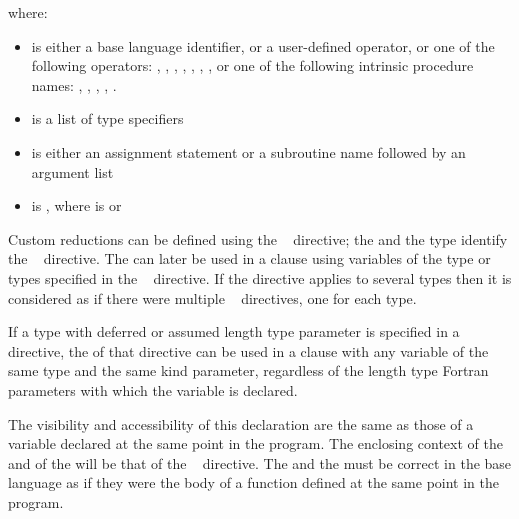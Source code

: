 where:

\begin{itemize}
\item {} is either a base language identifier, or a user-defined operator, or 
one of the following operators: 
\code{+}, 
\code{-}, 
\code{*}, 
, 
, 
, 
, or one of the following intrinsic procedure names: 
, 
, 
, 
, 
. 

\item {} is a list of type specifiers 

\item {} is either an assignment statement or a subroutine name followed by an 
argument list 

\item {} is \code{)}, 
where  is\linebreak
{} or \code{(}\code{)}
\end{itemize}
\fortranspecificend

\descr
Custom reductions can be defined using the ~ directive; the 
 and the type identify the ~ directive. The 
 can later be used in a  clause using variables of the 
type or types specified in the ~ directive. If the directive applies 
to several types then it is considered as if there were multiple ~ 
directives, one for each type.

\fortranspecificstart
If a type with deferred or assumed length type parameter is specified in a ~ directive, the  of that directive can be used in a  clause with any variable of the same type and the same kind parameter, regardless of the length type Fortran parameters with which the variable is declared.
\fortranspecificend

The visibility and accessibility of this declaration are the same as those of a variable 
declared at the same point in the program. The enclosing context of the  and of 
the  will be that of the ~ directive. The  
and the  must be correct in the base language as if they were the body of 
a function defined at the same point in the program.

